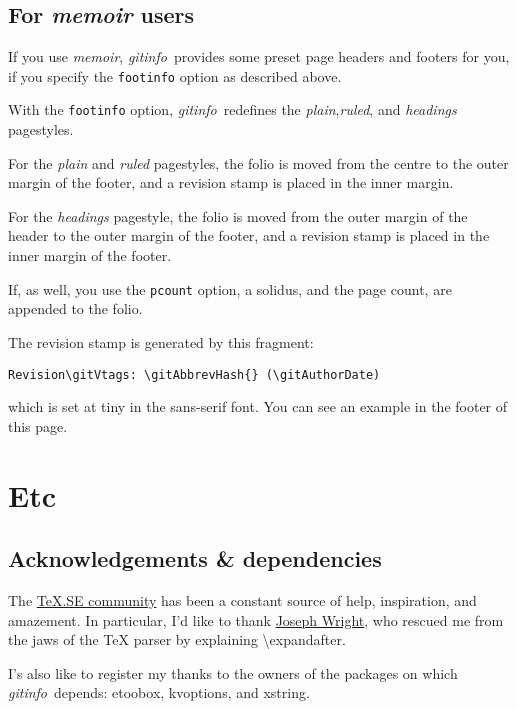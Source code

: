 \documentclass[a4paper,12pt,twoside,openany]{memoir}
\newcommand{\sfit}[1]{\textit{#1}}
\newcommand{\tpname}{\sfit{gitinfo}}
\begin{document}
\section{For \sfit{memoir} users}
If you use \sfit{memoir}, \tpname\ provides some preset page
headers and footers for you,
if you specify the \texttt{footinfo} option as described above.

With the \texttt{footinfo} option, \tpname\ redefines
the \sfit{plain},\sfit{ruled}, and \sfit{headings} pagestyles.

For the \sfit{plain} and \sfit{ruled} pagestyles,
the folio is moved from the centre to the outer margin of the footer,
and a revision stamp is placed in the inner margin.

For the \sfit{headings} pagestyle,
the folio is moved from the outer margin of the header
to the outer margin of the footer,
and a revision stamp is placed in the inner margin of the footer.

If, as well, you use the \texttt{pcount} option, a solidus, and the page count,
are appended to the folio.

The revision stamp is generated by this fragment:
\vspace{0.5\baselineskip}

\noindent
\verb!Revision\gitVtags: \gitAbbrevHash{} (\gitAuthorDate)!
\vspace{0.5\baselineskip}

\noindent
which is set at tiny in the sans-serif font.
You can see an example in the footer of this page.
\chapter{Etc}
\section{Acknowledgements \& dependencies}

The \href{http://tex.stackexchange.com}{\TeX.SE community}
has been a constant source of help, inspiration, and amazement.
In particular, I'd like to thank
\href{http://tex.stackexchange.com/users/73/joseph-wright}{Joseph Wright},
who rescued me from the jaws of the TeX parser by explaining
\textbackslash expandafter.

I's also like to register my thanks to the owners of the packages on which
\tpname\ depends: etoobox, kvoptions, and xstring.
\end{document}
